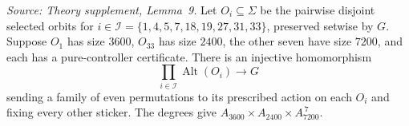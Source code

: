 \begin{lemma}
  \label{lem:supported-alternating-actions}
  \leanok
  \textit{Source: Theory supplement, Lemma~9.}
  Let \(O_i\subseteq\Sigma\) be the pairwise disjoint selected orbits for
  \(i\in\mathcal I=\{1,4,5,7,18,19,27,31,33\}\), preserved setwise by
  \(G\). Suppose \(O_1\) has size \(3600\), \(O_{33}\) has size \(2400\),
  the other seven have size \(7200\), and each has a pure-controller
  certificate. There is an injective homomorphism
  \[
    \prod_{i\in\mathcal I}\operatorname{Alt}(O_i)\longrightarrow G
  \]
  sending a family of even permutations to its prescribed action on
  each \(O_i\) and fixing every other sticker. The degrees give
  \(A_{3600}\times A_{2400}\times A_{7200}^{\,7}\).
\end{lemma}
%
